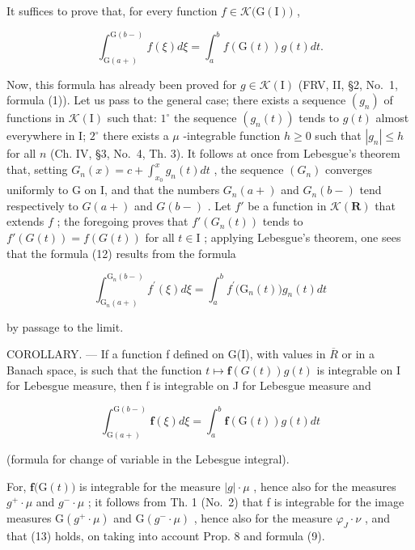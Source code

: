 It suffices to prove that, for every function \(f \in \mathcal{K}\big(\mathrm{G}(\mathrm{I})\big)\) ,

\[
\int_ {\mathrm{G} (a +)} ^ {\mathrm{G} (b -)} f (\xi) d \xi = \int_ {a} ^ {b} f (\mathrm{G} (t)) g (t) d t.\tag{12}
\]

Now, this formula has already been proved for \(g \in \mathcal{K}(\mathrm{I})\) (FRV, II, §2, No.~1, formula (1)). Let us pass to the general case; there exists a sequence \((g_n)\) of functions in \(\mathcal{K}(\mathrm{I})\) such that: \(1^\circ\) the sequence \((g_n(t))\) tends to \(g(t)\) almost everywhere in I; \(2^\circ\) there exists a \(\mu\) -integrable function \(h \geqslant 0\) such that \(|g_n| \leqslant h\) for all \(n\) (Ch. IV, §3, No.~4, Th. 3). It follows at once from Lebesgue's theorem that, setting \(G_n(x) = c + \int_{x_0}^x g_n(t) dt\) , the sequence \((G_n)\) converges uniformly to G on I, and that the numbers \(G_n(a+)\) and \(G_n(b-)\) tend respectively to \(G(a+)\) and \(G(b-)\) . Let \(f'\) be a function in \(\mathcal{K}(\mathbf{R})\) that extends \(f\) ; the foregoing proves that \(f'(G_n(t))\) tends to \(f'(G(t)) = f(G(t))\) for all \(t \in \mathrm{I}\) ; applying Lebesgue's theorem, one sees that the formula (12) results from the formula

\[
\int_ {\mathrm{G} _ {n} (a +)} ^ {\mathrm{G} _ {n} (b -)} f ^ {\prime} (\xi) d \xi = \int_ {a} ^ {b} f ^ {\prime} \bigl (\mathrm{G} _ {n} (t) \bigr) g _ {n} (t) d t
\]

by passage to the limit.

COROLLARY. --- If a function f defined on G(I), with values in \(\overline{R}\) or in a Banach space, is such that the function \(t \mapsto \mathbf{f}(G(t))g(t)\) is integrable on I for Lebesgue measure, then f is integrable on J for Lebesgue measure and

\[
\int_ {\mathrm{G} (a +)} ^ {\mathrm{G} (b -)} \mathbf {f} (\xi) d \xi = \int_ {a} ^ {b} \mathbf {f} (\mathrm{G} (t)) g (t) d t\tag{13}
\]

(formula for change of variable in the Lebesgue integral).

For, \(\mathbf{f}\big(\mathrm{G}(t)\big)\) is integrable for the measure \(|g|\cdot\mu\) , hence also for the measures \(g^{+}\cdot\mu\) and \(g^{-}\cdot\mu\) ; it follows from Th. 1 (No.~2) that f is integrable for the image measures \(\mathrm{G}(g^{+}\cdot\mu)\) and \(\mathrm{G}(g^{-}\cdot\mu)\) , hence also for the measure \(\varphi_{J}\cdot\nu\) , and that (13) holds, on taking into account Prop. 8 and formula (9).

